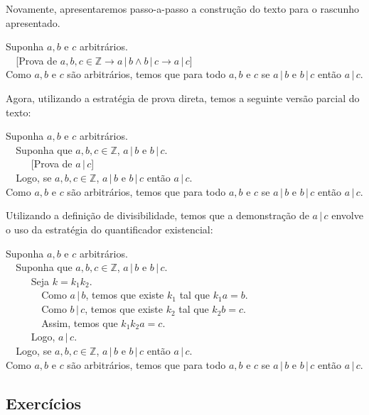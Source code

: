 \begin{Example}
Novamente, apresentaremos passo-a-passo a construção do texto para o
rascunho apresentado.
\begin{flushleft}
Suponha $a,b$ e $c$ arbitrários.\\
\verb|  |[Prova de $a,b,c\in\mathbb{Z} \to a\,|\,b \land b\,|\,c \to a
\,|\, c$]\\
Como $a,b$ e $c$ são arbitrários, temos que para todo $a,b$ e $c$ se
$a\,|\,b$ e $b\,|\,c$ então $a\,|\,c$.
\end{flushleft}
Agora, utilizando a estratégia de prova direta, temos a seguinte
versão parcial do texto:
\begin{flushleft}
Suponha $a,b$ e $c$ arbitrários.\\
\verb|  |Suponha que $a,b,c\in\mathbb{Z}$, $ a\,|\,b$ e $b\,|\,c$.\\
\verb|     |[Prova de $ a\,|\, c$]\\
\verb|  |Logo, se $a,b,c\in\mathbb{Z}$, $ a\,|\,b$ e $b\,|\,c$ então $a\,|\,c$.\\
Como $a,b$ e $c$ são arbitrários, temos que para todo $a,b$ e $c$ se
$a\,|\,b$ e $b\,|\,c$ então $a\,|\,c$.
\end{flushleft}
Utilizando a definição de divisibilidade, temos que a demonstração de
$a\,|\,c$ envolve o uso da estratégia do quantificador existencial:
\begin{flushleft}
Suponha $a,b$ e $c$ arbitrários.\\
\verb|  |Suponha que $a,b,c\in\mathbb{Z}$, $ a\,|\,b$ e $b\,|\,c$.\\
\verb|     |Seja $k=k_1k_2$.\\
\verb|       |Como $a\,|\,b$, temos que existe $k_1$ tal que $k_1a =
b$.\\
\verb|       |Como $b\,|\,c$, temos que existe $k_2$ tal que $k_2b =
c$.\\
\verb|       |Assim, temos que $k_1k_2a = c$.\\
\verb|     |Logo, $a\,|\,c$.\\
\verb|  |Logo, se $a,b,c\in\mathbb{Z}$, $ a\,|\,b$ e $b\,|\,c$ então $a\,|\,c$.\\
Como $a,b$ e $c$ são arbitrários, temos que para todo $a,b$ e $c$ se
$a\,|\,b$ e $b\,|\,c$ então $a\,|\,c$.
\end{flushleft}
\end{Example}

\subsection{Exercícios}

